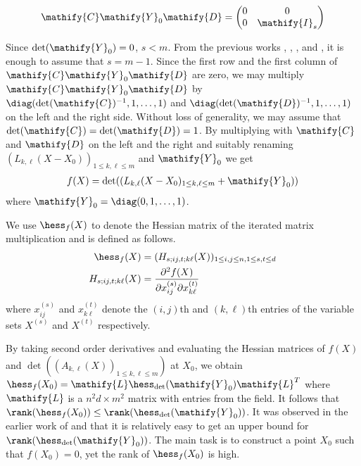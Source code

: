 \begin{align*}
  \mathify{C}\mathify{Y}_0\mathify{D} =
  \begin{pmatrix}
    0& 0\\
    0& \mathify{I}_s\\
  \end{pmatrix}
\end{align*}

Since $\det(\mathify{Y}_0)=0$, $s<m$. From the previous works \cite{von1987}, \cite{cai1990}, \cite{mt2004}, and \cite{ccl2008}, it is enough to assume that $s=m-1$. Since the first row and the first column of $\mathify{C}\mathify{Y}_0\mathify{D}$ are zero, we may multiply $\mathify{C}\mathify{Y}_0\mathify{D}$ by $\diag(\det(\mathify{C})^{-1},1,\dots,1)$ and $\diag(\det(\mathify{D})^{-1},1,\dots,1)$ on the left and the right side. Without loss of generality, we may assume that $\det(\mathify{C})=\det(\mathify{D})=1$. By multiplying with $\mathify{C}$ and $\mathify{D}$ on the left and the right and suitably renaming $(L_{k,\ell}(X-X_0))_{1\leq k,\ell\leq m}$ and $\mathify{Y}_0$ we get
\begin{align*}
  f(X) = \det((L_{k,\ell}(X-X_0)_{1\leq k,\ell\leq m} + \mathify{Y}_0))
\end{align*}
where $\mathify{Y}_0 = \diag(0,1,\dots,1)$. 

We use $\hess_{f}(X)$ to denote the Hessian matrix of the iterated matrix multiplication and is defined as follows.
\begin{align*}
  \hess_{f}(X) &= (H_{s;ij,t;k\ell}(X))_{1\leq i,j\leq n, 1\leq s,t \leq d }\\
  H_{s;ij,t;k\ell}(X) &= \frac{\partial^2f(X)}{\partial x_{ij}^{(s)}\partial x_{k\ell}^{(t)}}
\end{align*}
where $x_{ij}^{(s)}$ and $x_{k\ell}^{(t)}$  denote the $(i,j)$th and $(k,\ell)$th entries of the variable sets $X^{(s)}$ and $X^{(t)}$ respectively. 

By taking second order derivatives and evaluating the Hessian matrices of $f(X)$ and $\det((A_{k,\ell}(X))_{1\leq k,\ell\leq m})$ at $X_0$, we obtain $\hess_{f}(X_0) = \mathify{L}\hess_{\det}(\mathify{Y}_0)\mathify{L}^{T}$ where $\mathify{L}$ is a $n^2d\times m^2$ matrix with entries from the field. It follows that $\rank(\hess_{f}(X_0)) \leq \rank(\hess_{\det}(\mathify{Y}_0))$. It was observed in the earlier work  of \cite{mt2004} and \cite{ccl2008} that it is relatively easy to get an upper bound for $\rank(\hess_{\det}(\mathify{Y}_0))$. 
The main task is to construct a point $X_0$ such that $f(X_0)=0$, yet the rank of $\hess_{f}(X_0)$ is high. 